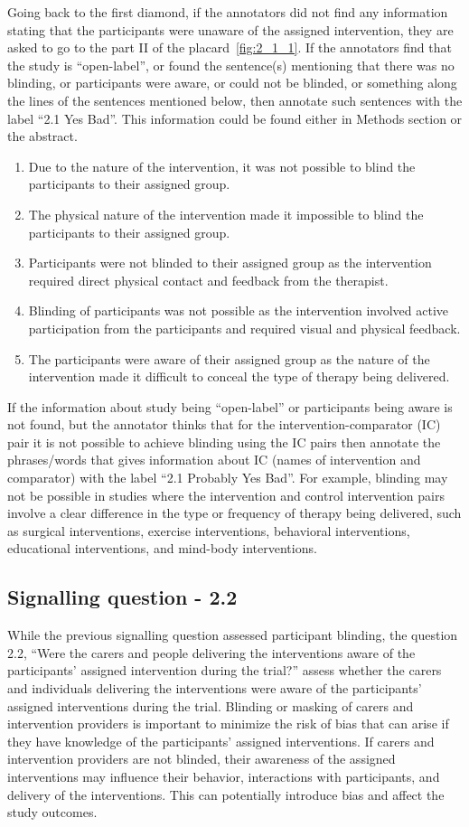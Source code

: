 \documentclass[sn-mathphys,Numbered]{sn-jnl}%
\begin{document}
Going back to the first diamond, if the annotators did not find any information stating that the participants were unaware of the assigned intervention, they are asked to go to the part II of the placard~\ref{fig:2_1_1}.
If the annotators find that the study is ``open-label'', or found the sentence(s) mentioning that there was no blinding, or participants were aware, or could not be blinded, or something along the lines of the sentences mentioned below, then annotate such sentences with the label ``2.1 Yes Bad''.
This information could be found either in Methods section or the abstract.
\begin{enumerate}
    \item Due to the nature of the intervention, it was not possible to blind the participants to their assigned group.
    \item The physical nature of the intervention made it impossible to blind the participants to their assigned group.
    \item Participants were not blinded to their assigned group as the intervention required direct physical contact and feedback from the therapist.
    \item Blinding of participants was not possible as the intervention involved active participation from the participants and required visual and physical feedback.
    \item The participants were aware of their assigned group as the nature of the intervention made it difficult to conceal the type of therapy being delivered.
\end{enumerate}
%
%
%
If the information about study being ``open-label'' or participants being aware is not found, but the annotator thinks that for the intervention-comparator (IC) pair it is not possible to achieve blinding using the IC pairs then annotate the phrases/words that gives information about IC (names of intervention and comparator) with the label ``2.1 Probably Yes Bad''.
For example, blinding may not be possible in studies where the intervention and control intervention pairs involve a clear difference in the type or frequency of therapy being delivered, such as surgical interventions, exercise interventions, behavioral interventions, educational interventions, and mind-body interventions.
%
%
%
\subsection*{Signalling question - 2.2}
\label{subsec:2_2}
%
While the previous signalling question assessed participant blinding, the question 2.2, ``Were the carers and people delivering the interventions aware of the participants' assigned intervention during the trial?'' assess whether the carers and individuals delivering the interventions were aware of the participants' assigned interventions during the trial.
Blinding or masking of carers and intervention providers is important to minimize the risk of bias that can arise if they have knowledge of the participants' assigned interventions. If carers and intervention providers are not blinded, their awareness of the assigned interventions may influence their behavior, interactions with participants, and delivery of the interventions. This can potentially introduce bias and affect the study outcomes.
\end{document}
